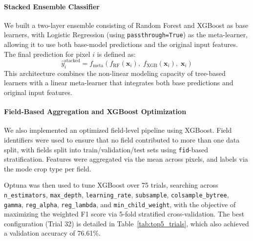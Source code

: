 \documentclass[pdflatex,sn-mathphys]{sn-jnl} %
\begin{document}
\paragraph{Stacked Ensemble Classifier}
    We built a two-layer ensemble consisting of Random Forest and XGBoost as base learners, with Logistic Regression (using \texttt{passthrough=True}) as the meta-learner, allowing it to use both base-model predictions and the original input features. The final prediction for pixel \(i\) is defined as:
    \[
    \hat{y}_i^{\text{stacked}} = f_{\text{meta}}\left(f_{\text{RF}}(\mathbf{x}_i),\; 
    f_{\text{XGB}}(\mathbf{x}_i),\; \mathbf{x}_i\right)
    \]
    This architecture combines the non-linear modeling capacity of tree-based learners with a linear meta-learner that integrates both base predictions and original input features.\\

\paragraph{Field-Based Aggregation and XGBoost Optimization}
    We also implemented an optimized field-level pipeline using XGBoost. Field identifiers were used to ensure that no field contributed to more than one data split, with fields split into train/validation/test sets using \texttt{fid}-based stratification. Features were aggregated via the mean across pixels, and labels via the mode crop type per field.

    Optuna was then used to tune XGBoost over 75 trials, searching across  \texttt{n\_estimators}, \texttt{max\_depth}, \texttt{learning\_rate}, \texttt{subsample}, \texttt{colsample\_bytree}, \texttt{gamma}, \texttt{reg\_alpha}, \texttt{reg\_lambda}, and \texttt{min\_child\_weight}, with the objective of maximizing the weighted F1 score via 5-fold stratified cross-validation. The best configuration (Trial 32) is detailed in Table~\ref{tab:top5_trials}, which also achieved a validation accuracy of 76.61\%.
\end{document}
